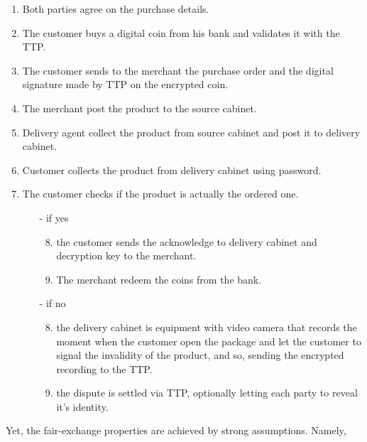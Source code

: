 \documentclass{ieeeaccess}
\begin{document}
\begin{enumerate}
    \item Both parties agree on the purchase details.
    \item The customer buys a digital coin from his bank and validates it with the TTP.
    \item The customer sends to the merchant the purchase order and the digital signature made by TTP on the encrypted coin.
    \item The merchant post the product to the source cabinet.
    \item Delivery agent collect the product from source cabinet and post it to delivery cabinet.
    \item Customer collects the product from delivery cabinet using password.
    \item The customer checks if the product is actually the ordered one.
    \begin{itemize}
    \item[-] if yes 
        \begin{enumerate}
        \setcounter{enumii}{7}
        \item the customer sends the acknowledge to delivery cabinet and decryption key to the merchant.
        \item The merchant redeem the coins from the bank.
        \end{enumerate}
    \item[-] if no
        \begin{enumerate}
        \setcounter{enumii}{7}
        \item the delivery cabinet is equipment with video camera that records the moment when the customer open the package and let the customer to signal the invalidity of the product, and so, sending the encrypted recording to the TTP. 
        \item the dispute is settled via TTP, optionally letting each party to reveal it's identity.
    \end{enumerate}
    \end{itemize}
\end{enumerate}
\endgroup

Yet, the fair-exchange properties are achieved by strong assumptions.
Namely,
\end{document}
